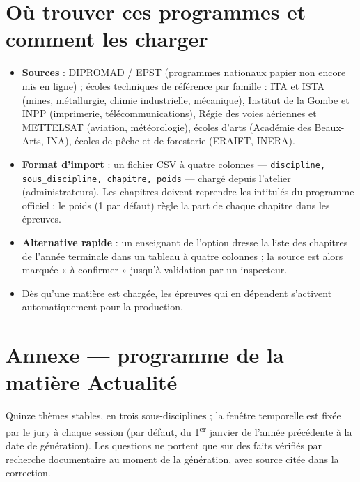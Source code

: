 \documentclass[11pt,a4paper]{article}
\begin{document}
\section{Où trouver ces programmes et comment les charger}
\begin{itemize}
\item \textbf{Sources} : DIPROMAD / EPST (programmes nationaux papier non encore mis en ligne) ; écoles techniques de référence par famille : ITA et ISTA (mines, métallurgie, chimie industrielle, mécanique), Institut de la Gombe et INPP (imprimerie, télécommunications), Régie des voies aériennes et METTELSAT (aviation, météorologie), écoles d'arts (Académie des Beaux-Arts, INA), écoles de pêche et de foresterie (ERAIFT, INERA).
\item \textbf{Format d'import} : un fichier CSV à quatre colonnes --- \texttt{discipline, sous\_discipline, chapitre, poids} --- chargé depuis l'atelier (administrateurs). Les chapitres doivent reprendre les intitulés du programme officiel ; le poids (1 par défaut) règle la part de chaque chapitre dans les épreuves.
\item \textbf{Alternative rapide} : un enseignant de l'option dresse la liste des chapitres de l'année terminale dans un tableau à quatre colonnes ; la source est alors marquée « à confirmer » jusqu'à validation par un inspecteur.
\item Dès qu'une matière est chargée, les épreuves qui en dépendent s'activent automatiquement pour la production.
\end{itemize}

\section*{Annexe --- programme de la matière Actualité}
Quinze thèmes stables, en trois sous-disciplines ; la fenêtre temporelle est fixée par le jury à chaque session (par défaut, du 1\textsuperscript{er} janvier de l'année précédente à la date de génération). Les questions ne portent que sur des faits vérifiés par recherche documentaire au moment de la génération, avec source citée dans la correction.
\end{document}
